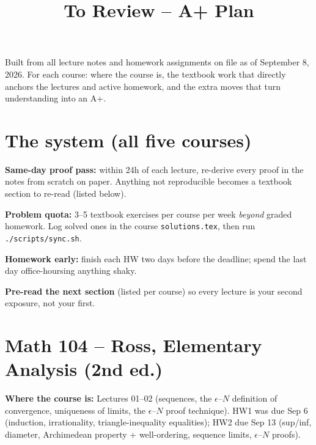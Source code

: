 \documentclass[11pt]{article}
\title{\vspace{-1.5em}\textbf{To Review -- A+ Plan}\\\large \docdate}
\author{\studentname}
\date{\docdate}
\newcommand{\docdate}{September 8, 2026}
\begin{document}
\maketitle

Built from all lecture notes and homework assignments on file as of \docdate.
For each course: where the course is, the textbook work that directly anchors the
lectures and active homework, and the extra moves that turn understanding into an
A+.

\section*{The system (all five courses)}
\begin{todo}
  \item \textbf{Same-day proof pass:} within 24h of each lecture, re-derive every
  proof in the notes from scratch on paper. Anything not reproducible becomes a
  textbook section to re-read (listed below).
  \item \textbf{Problem quota:} 3--5 textbook exercises per course per week
  \emph{beyond} graded homework. Log solved ones in the course
  \texttt{solutions.tex}, then run \texttt{./scripts/sync.sh}.
  \item \textbf{Homework early:} finish each HW two days before the deadline; spend
  the last day office-hoursing anything shaky.
  \item \textbf{Pre-read the next section} (listed per course) so every lecture is
  your second exposure, not your first.
\end{todo}

\section*{Math 104 -- Ross, Elementary Analysis (2nd ed.)}
\textbf{Where the course is:} Lectures 01--02 (sequences, the $\epsilon$--$N$
definition of convergence, uniqueness of limits, the $\epsilon$--$N$ proof
technique). HW1 was due Sep 6 (induction, irrationality, triangle-inequality
equalities); HW2 due Sep 13 (sup/inf, diameter, Archimedean property +
well-ordering, sequence limits, $\epsilon$--$N$ proofs).
\end{document}
